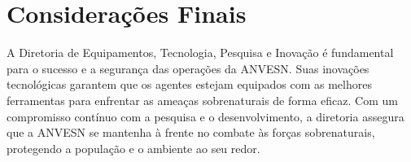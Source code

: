 \section{Considerações Finais}

A Diretoria de Equipamentos, Tecnologia, Pesquisa e Inovação é fundamental para o sucesso e a segurança das operações da ANVESN. Suas inovações tecnológicas garantem que os agentes estejam equipados com as melhores ferramentas para enfrentar as ameaças sobrenaturais de forma eficaz. Com um compromisso contínuo com a pesquisa e o desenvolvimento, a diretoria assegura que a ANVESN se mantenha à frente no combate às forças sobrenaturais, protegendo a população e o ambiente ao seu redor.
